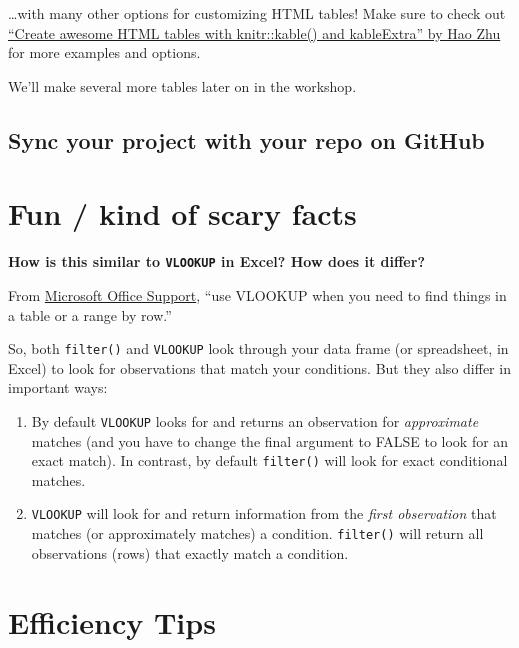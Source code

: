 \documentclass[]{book}
\begin{document}
\ldots{}with many other options for customizing HTML tables! Make sure to check out \href{https://cran.r-project.org/web/packages/kableExtra/vignettes/awesome_table_in_html.html}{``Create awesome HTML tables with knitr::kable() and kableExtra'' by Hao Zhu} for more examples and options.

We'll make several more tables later on in the workshop.

\hypertarget{sync-your-project-with-your-repo-on-github}{%
\subsection{Sync your project with your repo on GitHub}\label{sync-your-project-with-your-repo-on-github}}

\hypertarget{fun-kind-of-scary-facts}{%
\section{Fun / kind of scary facts}\label{fun-kind-of-scary-facts}}

\textbf{How is this similar to \texttt{VLOOKUP} in Excel? How does it differ?}

From \href{https://support.office.com/en-us/article/vlookup-function-0bbc8083-26fe-4963-8ab8-93a18ad188a1}{Microsoft Office Support}, ``use VLOOKUP when you need to find things in a table or a range by row.''

So, both \texttt{filter()} and \texttt{VLOOKUP} look through your data frame (or spreadsheet, in Excel) to look for observations that match your conditions. But they also differ in important ways:

\begin{enumerate}
\def\labelenumi{(\arabic{enumi})}
\item
  By default \texttt{VLOOKUP} looks for and returns an observation for \emph{approximate} matches (and you have to change the final argument to FALSE to look for an exact match). In contrast, by default \texttt{filter()} will look for exact conditional matches.
\item
  \texttt{VLOOKUP} will look for and return information from the \emph{first observation} that matches (or approximately matches) a condition. \texttt{filter()} will return all observations (rows) that exactly match a condition.
\end{enumerate}

\hypertarget{efficiency-tips-3}{%
\section{Efficiency Tips}\label{efficiency-tips-3}}
\end{document}
